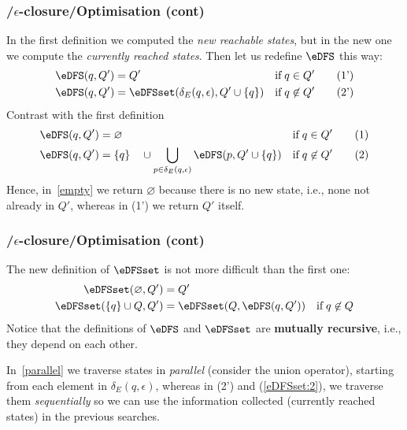 % 
\begin{frame}
\frametitle{\eNFA{}/\(\epsilon\)-closure/Optimisation (cont)}

In the first definition we computed the \emph{new reachable states},
but in the new one we compute the \emph{currently reached
  states}. Then let us redefine \(\eDFS\) this way:
\begin{align*}
  \eDFS (q, Q') 
&= Q'
&& \text{if} \; q \in Q' \tag{1'}\\
  \eDFS (q, Q')
&= \eDFSset (\delta_E (q, \epsilon), Q' \cup \{q\})
&& \text{if} \; q \not\in Q' \tag{2'}
\end{align*}
Contrast with the first definition
\begin{align*}
   \eDFS (q, Q') 
&= \varnothing 
& \text{if} \; q \in Q' \tag{1} \label{empty}\\
  \eDFS (q, Q') 
&= \{q\} \quad \cup \bigcup_{p \in \delta_E(q,\epsilon)}{\eDFS (p, Q'
    \cup \{q\})}
& \text{if} \; q \not\in Q' \tag{2} \label{parallel}
\end{align*}
Hence, in~\eqref{empty} we return \(\varnothing\) because there is no
new state, i.e., none not already in \(Q'\), whereas in (1') we return
\(Q'\) itself.

\end{frame}

% 
\begin{frame}
\frametitle{\eNFA{}/\(\epsilon\)-closure/Optimisation (cont)}

The new definition of \(\eDFSset\) is not more difficult than the
first one:
\begin{align}
   \eDFSset (\varnothing, Q')
&= Q'\label{eDFSset:1}\\
   \eDFSset (\{q\} \cup Q, Q')
&= \eDFSset (Q, \eDFS (q, Q')) 
& \text{if} \; q \not\in Q \label{eDFSset:2}
\end{align}
Notice that the definitions of \(\eDFS\) and \(\eDFSset\) are
\textbf{mutually recursive}, i.e., they depend on each other.

\bigskip

In~\eqref{parallel} we traverse states in \emph{parallel} (consider
the union operator), starting from each element in \(\delta_E (q,
\epsilon)\), whereas in (2') and (\ref{eDFSset:2}), we traverse them
\emph{sequentially} so we can use the information collected (currently
reached states) in the previous searches.

\end{frame}

